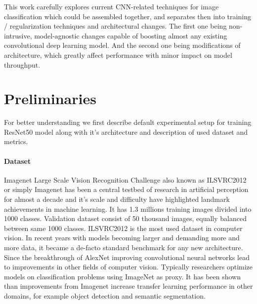 
This work carefully explores current CNN-related techniques for image classification which could be assembled together, and separates then into training / regularization techniques and architectural changes. The first one being non-intrusive, model-agnostic changes capable of boosting almost any existing convolutional deep learning model. And the second one being modifications of architecture, which greatly affect performance with minor impact on model throughput. 



\section{Preliminaries} \label{sec: preliminaries}
For better understanding we first describe default experimental setup for training ResNet50 model along with it's architecture and description of used dataset and metrics. 

\paragraph{Dataset} \label{subsec: imagenet}


Imagenet Large Scale Vision Recognition Challenge also known as ILSVRC2012 or simply Imagenet has been a central testbed of research in artificial perception for almost a decade and it's scale and difficulty have highlighted landmark achievements in machine learning. It has 1.3 millions training images divided into 1000 classes. Validation dataset consist of 50 thousand images, equally balanced between same 1000 classes. ILSVRC2012 is the most used dataset in computer vision. %
In recent years with models becoming larger and demanding more and more data, it became a de-facto standard benchmark for any new architecture. Since the breakthrough of AlexNet improving convolutional neural networks lead to improvements in other fields of computer vision. Typically researchers optimize models on classification problems using ImageNet \cite{deng2009_imagenet} as proxy. It has been shown \cite{he2019bag_of_tricks} \cite{kornblith2019_better} than improvements from Imagenet increase transfer learning performance in other domains, for example object detection and semantic segmentation.


